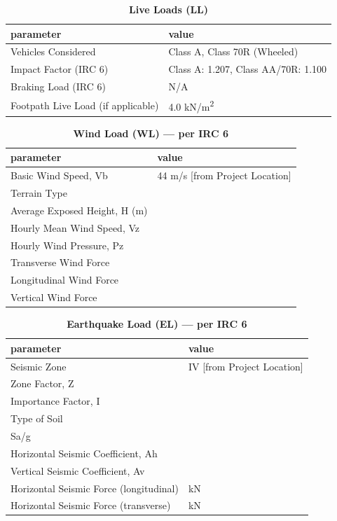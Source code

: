 \documentclass[12pt,a4paper]{report}
\numberwithin{table}{chapter}
\numberwithin{figure}{chapter}
\begin{document}
\vspace{1em}
\begin{longtable}{|L{5.5cm}|p{10.0cm}|}
\caption{\textbf{Live Loads (LL)}}
\hline
\textbf{parameter} & \textbf{value} \\
\hline
\textnormal{Vehicles Considered} & Class A, Class 70R (Wheeled) \\[6pt]
\hline
\textnormal{Impact Factor (IRC 6)} & Class A:\allowbreak{} 1.207, Class AA/70R:\allowbreak{} 1.100 \\[6pt]
\hline
\textnormal{Braking Load (IRC 6)} & N/A \\[6pt]
\hline
\textnormal{Footpath Live Load (if applicable)} & 4.0 kN/m\textsuperscript{2} \\[6pt]
\hline
\end{longtable}

\vspace{1em}
\begin{longtable}{|L{5.5cm}|p{10.0cm}|}
\caption{\textbf{Wind Load (WL) --- per IRC 6}}
\hline
\textbf{parameter} & \textbf{value} \\
\hline
\textnormal{Basic Wind Speed, Vb} & 44 m/s [from Project Location] \\[6pt]
\hline
\textnormal{Terrain Type} &  \\[6pt]
\hline
\textnormal{Average Exposed Height, H (m)} &  \\[6pt]
\hline
\textnormal{Hourly Mean Wind Speed, Vz} &  \\[6pt]
\hline
\textnormal{Hourly Wind Pressure, Pz} &  \\[6pt]
\hline
\textnormal{Transverse Wind Force} &  \\[6pt]
\hline
\textnormal{Longitudinal Wind Force} &  \\[6pt]
\hline
\textnormal{Vertical Wind Force} &  \\[6pt]
\hline
\end{longtable}

\vspace{1em}
\begin{longtable}{|L{5.5cm}|p{10.0cm}|}
\caption{\textbf{Earthquake Load (EL) --- per IRC 6}}
\hline
\textbf{parameter} & \textbf{value} \\
\hline
\textnormal{Seismic Zone} & IV [from Project Location] \\[6pt]
\hline
\textnormal{Zone Factor, Z} &  \\[6pt]
\hline
\textnormal{Importance Factor, I} &  \\[6pt]
\hline
\textnormal{Type of Soil} &  \\[6pt]
\hline
\textnormal{Sa/g} &  \\[6pt]
\hline
\textnormal{Horizontal Seismic Coefficient, Ah} &  \\[6pt]
\hline
\textnormal{Vertical Seismic Coefficient, Av} &  \\[6pt]
\hline
\textnormal{Horizontal Seismic Force (longitudinal)} &  kN \\[6pt]
\hline
\textnormal{Horizontal Seismic Force (transverse)} &  kN \\[6pt]
\hline
\end{longtable}
\end{document}
